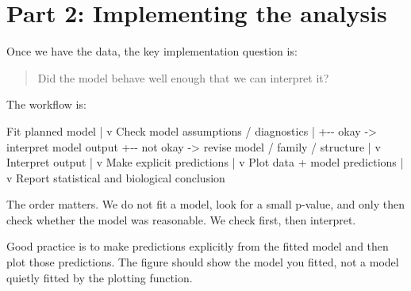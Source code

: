 \documentclass[
  letterpaper,
  8pt,
  a4paper]{book}
\newenvironment{Shaded}{\begin{snugshade}}{\end{snugshade}}
\newcommand{\NormalTok}[1]{\textcolor[rgb]{0.00,0.23,0.31}{#1}}
\begin{document}
\section*{Part 2: Implementing the
analysis}\label{part-2-implementing-the-analysis}


Once we have the data, the key implementation question is:

\begin{quote}
Did the model behave well enough that we can interpret it?
\end{quote}

The workflow is:

\begin{Shaded}
\begin{Highlighting}[]
\NormalTok{Fit planned model}
\NormalTok{        |}
\NormalTok{        v}
\NormalTok{Check model assumptions / diagnostics}
\NormalTok{        |}
\NormalTok{        +{-}{-} okay {-}\textgreater{} interpret model output}
\NormalTok{        +{-}{-} not okay {-}\textgreater{} revise model / family / structure}
\NormalTok{        |}
\NormalTok{        v}
\NormalTok{Interpret output}
\NormalTok{        |}
\NormalTok{        v}
\NormalTok{Make explicit predictions}
\NormalTok{        |}
\NormalTok{        v}
\NormalTok{Plot data + model predictions}
\NormalTok{        |}
\NormalTok{        v}
\NormalTok{Report statistical and biological conclusion}
\end{Highlighting}
\end{Shaded}

\begin{tcolorbox}[enhanced jigsaw, arc=.35mm, bottomrule=.15mm, bottomtitle=1mm, breakable, colback=white, colbacktitle=quarto-callout-important-color!10!white, colframe=quarto-callout-important-color-frame, coltitle=black, left=2mm, leftrule=.75mm, opacityback=0, opacitybacktitle=0.6, rightrule=.15mm, title=\textcolor{quarto-callout-important-color}{\faExclamation}\hspace{0.5em}{Important}, titlerule=0mm, toprule=.15mm, toptitle=1mm]

The order matters. We do not fit a model, look for a small p-value, and
only then check whether the model was reasonable. We check first, then
interpret.

\end{tcolorbox}

Good practice is to make predictions explicitly from the fitted model
and then plot those predictions. The figure should show the model you
fitted, not a model quietly fitted by the plotting function.
\end{document}
